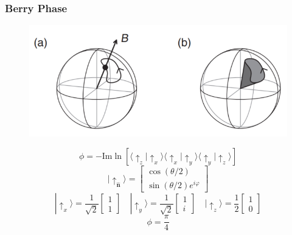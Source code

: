 \documentclass{beamer}
\begin{document}
\begin{frame}
\frametitle{Berry Phase}
\begin{figure}
\centering
\includegraphics[scale=0.5]{pic/p1.png}
\end{figure}
\begin{equation}
\phi=-\textrm{Im}\ln\left[\langle \uparrow_z|\uparrow_x\rangle\langle\uparrow_x|\uparrow_y\rangle\langle\uparrow_y|\uparrow_z\rangle\right]
\end{equation}
\begin{equation}
|\uparrow_{\mathbf{\hat{n}}}\rangle=\left[
\begin{array}{c}
\cos(\theta/2)\\
\sin(\theta/2)e^{i\varphi}
\end{array}
\right]
\end{equation}
\begin{equation}
|\uparrow_x\rangle=\frac{1}{\sqrt{2}}\left[
\begin{array}{c}
1\\
1
\end{array}
\right]\quad
|\uparrow_y\rangle=\frac{1}{\sqrt{2}}\left[
\begin{array}{c}
1\\
i
\end{array}
\right]\quad
|\uparrow_z\rangle=\frac{1}{2}\left[
\begin{array}{c}
1\\
0
\end{array}
\right]
\end{equation}
$$\phi=\frac{\pi}{4}$$
\end{frame}
\end{document}
